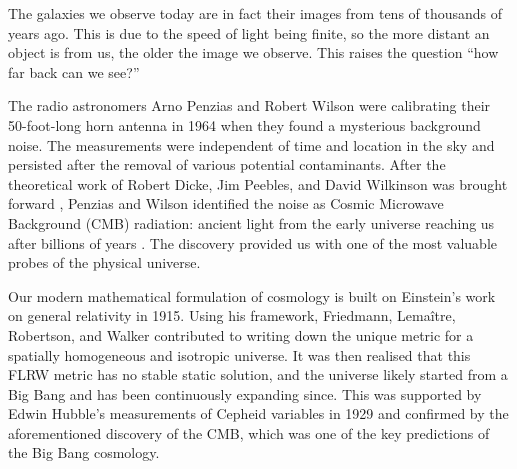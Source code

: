 %
%
%
%
%
%
%
%
%
%
%
%

The galaxies we observe today are in fact their images from tens of thousands of years ago. This is due to the speed of light being finite, so the more distant an object is from us, the older the image we observe. This raises the question ``how far back can we see?''

The radio astronomers Arno Penzias and Robert Wilson were calibrating their 50-foot-long horn antenna in 1964 when they found a mysterious background noise. The measurements were independent of time and location in the sky and persisted after the removal of various potential contaminants. After the theoretical work of Robert Dicke, Jim Peebles, and David Wilkinson was brought forward \cite{Dicke1965}, Penzias and Wilson identified the noise as Cosmic Microwave Background (CMB) radiation: ancient light from the early universe reaching us after billions of years \cite{Penzias1965}. The discovery provided us with one of the most valuable probes of the physical universe. %

Our modern mathematical formulation of cosmology is built on Einstein's work on general relativity in 1915. Using his framework, Friedmann, Lemaître, Robertson, and Walker contributed to writing down the unique metric for a spatially homogeneous and isotropic universe.  It was then realised that this FLRW metric has no stable static solution, and the universe likely started from a Big Bang and has been continuously expanding since. This was supported by Edwin Hubble's measurements of Cepheid variables in 1929 and confirmed by the aforementioned discovery of the CMB, which was one of the key predictions of the Big Bang cosmology.

